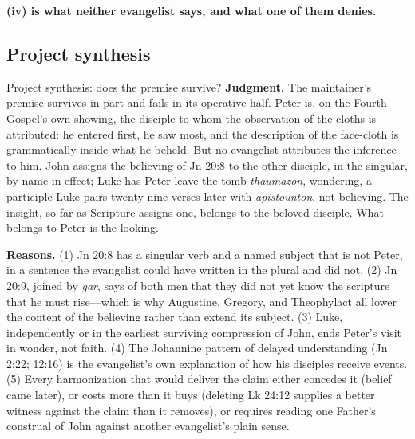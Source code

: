 \textbf{(iv) is what neither evangelist says, and what one of them denies.}

\subsection{Project synthesis}

\begin{studybox}{Project synthesis: does the premise survive?}
\textbf{Judgment.} The maintainer's premise survives in part and fails in its
operative half. Peter is, on the Fourth Gospel's own showing, the disciple to
whom the observation of the cloths is attributed: he entered first, he saw
most, and the description of the face-cloth is grammatically inside what he
beheld. But no evangelist attributes the inference to him. John assigns the
believing of Jn 20:8 to the other disciple, in the singular, by name-in-effect;
Luke has Peter leave the tomb \emph{thaumaz\=on}, wondering, a participle Luke
pairs twenty-nine verses later with \emph{apistount\=on}, not believing. The
insight, so far as Scripture assigns one, belongs to the beloved disciple. What
belongs to Peter is the looking.

\textbf{Reasons.} (1) Jn 20:8 has a singular verb and a named subject that is
not Peter, in a sentence the evangelist could have written in the plural and did
not. (2) Jn 20:9, joined by \emph{gar}, says of both men that they did not yet
know the scripture that he must rise---which is why Augustine, Gregory, and
Theophylact all lower the content of the believing rather than extend its
subject. (3) Luke, independently or in the earliest surviving compression of
John, ends Peter's visit in wonder, not faith. (4) The Johannine pattern of
delayed understanding (Jn 2:22; 12:16) is the evangelist's own explanation of
how his disciples receive events. (5) Every harmonization that would deliver
the claim either concedes it (belief came later), or costs more than it buys
(deleting Lk 24:12 supplies a better witness against the claim than it
removes), or requires reading one Father's construal of John against another
evangelist's plain sense.


\end{studybox}
